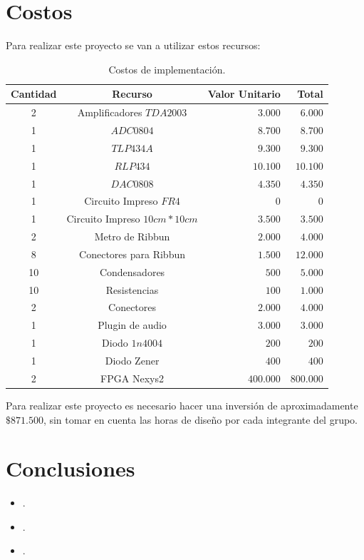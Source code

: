 \documentclass[10pt,graphicx,caption,rotating]{article}
\begin{document}
\section{Costos}
\noindent
Para realizar este proyecto se van a utilizar estos recursos:
\begin{table}[H]
	\centering
\begin{tabular}{|c|c|r|r|}\hline
 \textbf{Cantidad} & \textbf{Recurso} & \textbf{Valor Unitario} & \textbf{Total} \\ \hline
 2 & Amplificadores $TDA2003$ & $3.000$ & $6.000$ \\ \hline
 1 & $ADC0804$ & $8.700$ & $8.700$ \\ \hline
 1 & $TLP434A$ & $9.300$ & $9.300$ \\ \hline
 1 & $RLP434$ & $10.100$ & $10.100$ \\ \hline
 1 & $DAC0808$ & $4.350$ & $4.350$ \\ \hline
 1 & Circuito Impreso $FR4$ & $0$ & $0$ \\ \hline
 1 & Circuito Impreso $10 cm * 10 cm$ & $3.500$ & $3.500$ \\ \hline
 2 & Metro de Ribbun & $2.000$ & $4.000$ \\ \hline
 8 & Conectores para Ribbun & $1.500$ & $12.000$ \\ \hline
 10 & Condensadores & $500$ & $5.000$ \\ \hline
 10 & Resistencias & $100$ & $1.000$ \\ \hline
 2 & Conectores & $2.000$ & $4.000$ \\ \hline
 1 & Plugin de audio & $3.000$ & $3.000$ \\ \hline
 1 & Diodo $1n4004$ & $200$ & $200$ \\ \hline
 1 & Diodo Zener & $400$ & $400$ \\ \hline
 2 & FPGA Nexys2 & $400.000$ & $800.000$ \\ \hline
    \end{tabular}
	\caption{Costos de implementación.}
	\label{tab1}
\end{table}
\noindent
Para realizar este proyecto es necesario hacer una inversión de aproximadamente $\$ 871.500$, sin tomar en cuenta las horas de diseño por cada integrante del grupo.

\section{Conclusiones}
\begin{itemize}
 \item .
 \item .
 \item .
\end{itemize}
\end{document}
